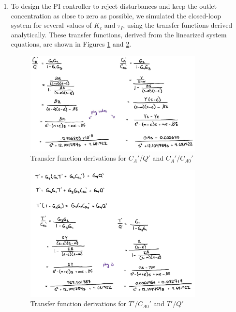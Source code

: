 \documentclass[12pt]{article}
\begin{document}
\begin{enumerate}
\begin{enumerate}
    \item To design the PI controller to reject disturbances and keep the outlet concentration as close to zero as possible, we simulated the closed-loop system for several values of $K_c$ and $\tau_I$, using the transfer functions derived analytically. These transfer functions, derived from the linearized system equations, are shown in Figures \ref{fig:figure2_5a} and \ref{fig:figure2_5b}.
    
    \begin{figure}[H]
      \centering
      \includegraphics[width=0.85\textwidth]{Figures/figure2_5a.png}
      \caption{Transfer function derivations for $C_A'/Q'$ and $C_A'/C_{A0}'$}
      \label{fig:figure2_5a}
    \end{figure}
    
    \begin{figure}[H]
      \centering
      \includegraphics[width=0.85\textwidth]{Figures/figure2_5b.png}
      \caption{Transfer function derivations for $T'/C_{A0}'$ and $T'/Q'$}
      \label{fig:figure2_5b}
    \end{figure}
    

\end{enumerate}
\end{enumerate}
\end{document}
